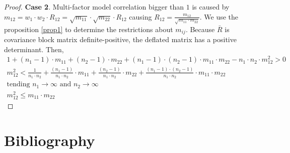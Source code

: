 \documentclass[11pt,fleqn]{book} %
\begin{document}
\begin{proof}
	\textbf{Case 2}. Multi-factor model correlation bigger than $1$ is caused
	by $m_{12} = w_1 \cdot w_2 \cdot R_{12} = \sqrt{m_{11}} \cdot \sqrt{m_{22}} \cdot R_{12}$
	causing $R_{12} = \frac{m_{12}}{\sqrt{m_{11} \cdot m_{22}}}$.
	We use the proposition \ref{prop1} to determine the restrictions about $m_{ij}$. 
	Because $\bar{R}$ is covariance block matrix definite-positive, the deflated 
	matrix has a positive determinant. Then,
	\begin{displaymath}
		\begin{array}{l}
			1 + (n_1-1) \cdot m_{11} + (n_2-1) \cdot m_{22} +                     
			(n_1-1) \cdot (n_2-1) \cdot m_{11} \cdot m_{22} -                     
			n_1 \cdot n_2 \cdot m_{12}^2 > 0                                      
			                                                                      \\
			m_{12}^2 <                                                            
			\frac{1}{n_1 \cdot n_2} +                                             
			\frac{(n_1-1)}{n_1 \cdot n_2} \cdot m_{11} +                          
			\frac{(n_2-1)}{n_1 \cdot n_2} \cdot m_{22} +                          
			\frac{(n_1-1) \cdot (n_2-1)}{n_1 \cdot n_2} \cdot m_{11} \cdot m_{22} 
			                                                                      \\
			\text{tending } n_1 \to \infty \text{ and } n_2 \to \infty            
			                                                                      \\
			m_{12}^2 \le m_{11} \cdot m_{22}                                      
		\end{array}
	\end{displaymath}
\end{proof}


\chapter*{Bibliography}
\end{document}
